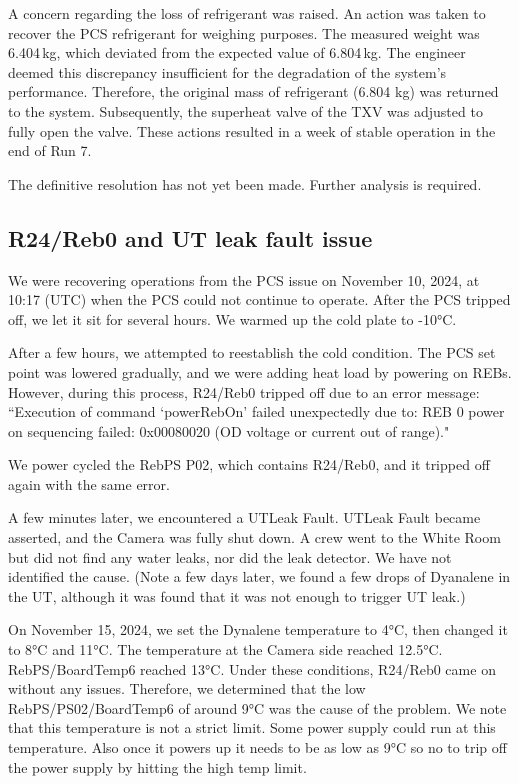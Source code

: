 A concern regarding the loss of refrigerant was raised. An action was taken to recover the PCS refrigerant for weighing purposes. The measured weight was 6.404\,kg, which deviated from the expected value of 6.804\,kg. The engineer deemed this discrepancy insufficient for the degradation of the system's performance. Therefore, the original mass of refrigerant (6.804 kg) was returned to the system. Subsequently, the superheat valve of the TXV was adjusted to fully open the valve. These actions resulted in a week of stable operation in the end of Run 7.

The definitive resolution has not yet been made. Further analysis is required.


\clearpage
\subsection{R24/Reb0 and UT leak fault issue}\label{sec:lowtempissue}
We were recovering operations from the PCS issue on November 10, 2024, at 10:17 (UTC) when the PCS could not continue to operate. After the PCS tripped off, we let it sit for several hours. We warmed up the cold plate to -10°C.

After a few hours, we attempted to reestablish the cold condition. The PCS set point was lowered gradually, and we were adding heat load by powering on REBs. However, during this process, R24/Reb0 tripped off due to an error message: ``Execution of command `powerRebOn' failed unexpectedly due to: REB 0 power on sequencing failed: 0x00080020 (OD voltage or current out of range)."

We power cycled the RebPS P02, which contains R24/Reb0, and it tripped off again with the same error.

A few minutes later, we encountered a UTLeak Fault. UTLeak Fault became asserted, and the Camera was fully shut down. A crew went to the White Room but did not find any water leaks, nor did the leak detector. We have not identified the cause. (Note a few days later, we found a few drops of Dyanalene in the UT, although it was found that it was not enough to trigger UT leak.)

On November 15, 2024, we set the Dynalene temperature to 4°C, then changed it to 8°C and 11°C. The temperature at the Camera side reached 12.5°C. RebPS/BoardTemp6 reached 13°C. Under these conditions, R24/Reb0 came on without any issues. Therefore, we determined that the low RebPS/PS02/BoardTemp6 of around 9°C was the cause of the problem. We note that this temperature is not a strict limit. Some power supply could run at this temperature. Also once it powers up it needs to be as low as 9°C so no to trip off the power supply by hitting the high temp limit.


